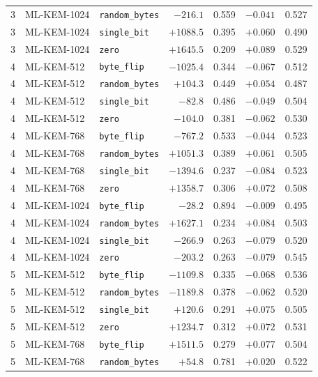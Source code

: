 \documentclass[a4paper,fontset=none]{ctexart}
\begin{document}
\begin{longtable}[c]{c>{\raggedright}p{2.2cm}>{\raggedright}p{2.6cm}rrrr}
  3 & ML-KEM-1024 & \texttt{random\_bytes} & $-216.1$   & 0.559 & $-0.041$ & 0.527 \\
  3 & ML-KEM-1024 & \texttt{single\_bit}   & $+1088.5$  & 0.395 & $+0.060$ & 0.490 \\
  3 & ML-KEM-1024 & \texttt{zero}          & $+1645.5$  & 0.209 & $+0.089$ & 0.529 \\
  \midrule
  4 & ML-KEM-512  & \texttt{byte\_flip}    & $-1025.4$  & 0.344 & $-0.067$ & 0.512 \\
  4 & ML-KEM-512  & \texttt{random\_bytes} & $+104.3$   & 0.449 & $+0.054$ & 0.487 \\
  4 & ML-KEM-512  & \texttt{single\_bit}   & $-82.8$    & 0.486 & $-0.049$ & 0.504 \\
  4 & ML-KEM-512  & \texttt{zero}          & $-104.0$   & 0.381 & $-0.062$ & 0.530 \\
  4 & ML-KEM-768  & \texttt{byte\_flip}    & $-767.2$   & 0.533 & $-0.044$ & 0.523 \\
  4 & ML-KEM-768  & \texttt{random\_bytes} & $+1051.3$  & 0.389 & $+0.061$ & 0.505 \\
  4 & ML-KEM-768  & \texttt{single\_bit}   & $-1394.6$  & 0.237 & $-0.084$ & 0.523 \\
  4 & ML-KEM-768  & \texttt{zero}          & $+1358.7$  & 0.306 & $+0.072$ & 0.508 \\
  4 & ML-KEM-1024 & \texttt{byte\_flip}    & $-28.2$    & 0.894 & $-0.009$ & 0.495 \\
  4 & ML-KEM-1024 & \texttt{random\_bytes} & $+1627.1$  & 0.234 & $+0.084$ & 0.503 \\
  4 & ML-KEM-1024 & \texttt{single\_bit}   & $-266.9$   & 0.263 & $-0.079$ & 0.520 \\
  4 & ML-KEM-1024 & \texttt{zero}          & $-203.2$   & 0.263 & $-0.079$ & 0.545 \\
  \midrule
  5 & ML-KEM-512  & \texttt{byte\_flip}    & $-1109.8$  & 0.335 & $-0.068$ & 0.536 \\
  5 & ML-KEM-512  & \texttt{random\_bytes} & $-1189.8$  & 0.378 & $-0.062$ & 0.520 \\
  5 & ML-KEM-512  & \texttt{single\_bit}   & $+120.6$   & 0.291 & $+0.075$ & 0.505 \\
  5 & ML-KEM-512  & \texttt{zero}          & $+1234.7$  & 0.312 & $+0.072$ & 0.531 \\
  5 & ML-KEM-768  & \texttt{byte\_flip}    & $+1511.5$  & 0.279 & $+0.077$ & 0.504 \\
  5 & ML-KEM-768  & \texttt{random\_bytes} & $+54.8$    & 0.781 & $+0.020$ & 0.522 \\

\end{longtable}
\end{document}
